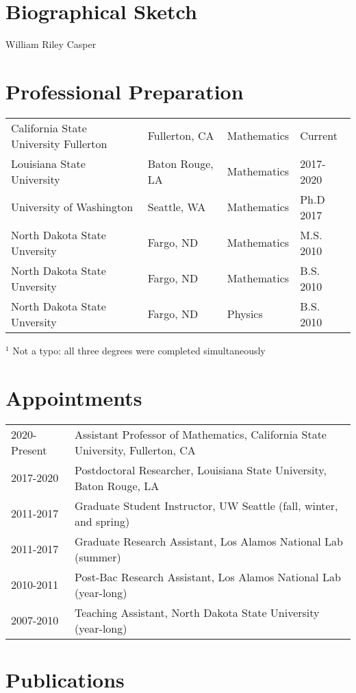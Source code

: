 \documentclass[11pt,letterpaper]{article}
\newcommand{\required}[1]{\section*{\hfil #1\hfil}}                    %
\theoremstyle{definition}
\begin{document}
\required{Biographical Sketch}
\begin{center}
William Riley Casper
\end{center}

\section{Professional Preparation}
\begin{tabular}{llll}
California State University Fullerton & Fullerton, CA & Mathematics & Current\\
Louisiana State University & Baton Rouge, LA & Mathematics & 2017-2020\\
University of Washington\hspace{2in}&Seattle, WA\hspace{2in}&Mathematics\hspace{2in}&Ph.D 2017\\
North Dakota State Unversity&Fargo, ND&Mathematics&M.S. 2010\footnotemark\\
North Dakota State Unversity&Fargo, ND&Mathematics&B.S. 2010\\
North Dakota State Unversity&Fargo, ND&Physics&B.S. 2010\\
\end{tabular}

{$^1$ \footnotesize Not a typo: all three degrees were completed simultaneously}
\section{Appointments}
\begin{tabular}{ll}
2020-Present & Assistant Professor of Mathematics, California State University, Fullerton, CA\\
2017-2020 & Postdoctoral Researcher, Louisiana State University, Baton Rouge, LA\\
2011-2017 & Graduate Student Instructor, UW Seattle (fall, winter, and spring)\\
2011-2017 & Graduate Research Assistant, Los Alamos National Lab (summer)\\
2010-2011 & Post-Bac Research Assistant, Los Alamos National Lab (year-long)\\
2007-2010 & Teaching Assistant, North Dakota State University (year-long)\\
\end{tabular}
\section{Publications}
\end{document}
